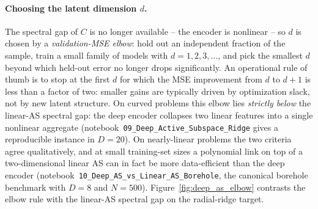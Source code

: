 \documentclass[11pt,a4paper]{report}
\begin{document}
\paragraph{Choosing the latent dimension $d$.}
The spectral gap of $C$ is no longer available -- the encoder is nonlinear -- so $d$ is chosen by a \emph{validation-MSE elbow}: hold out an independent fraction of the sample, train a small family of models with $d = 1, 2, 3, \ldots$, and pick the smallest $d$ beyond which held-out error no longer drops significantly.  An operational rule of thumb is to stop at the first $d$ for which the MSE improvement from $d$ to $d+1$ is less than a factor of two: smaller gains are typically driven by optimization slack, not by new latent structure.  On curved problems this elbow lies \emph{strictly below} the linear-AS spectral gap: the deep encoder collapses two linear features into a single nonlinear aggregate (notebook~\texttt{09\_Deep\_Active\_Subspace\_Ridge} gives a reproducible instance in $D = 20$).  On nearly-linear problems the two criteria agree qualitatively, and at small training-set sizes a polynomial link on top of a two-dimensional linear AS can in fact be more data-efficient than the deep encoder (notebook~\texttt{10\_Deep\_AS\_vs\_Linear\_AS\_Borehole}, the canonical borehole benchmark with $D = 8$ and $N = 500$).  Figure~\ref{fig:deep_as_elbow} contrasts the elbow rule with the linear-AS spectral gap on the radial-ridge target.
\end{document}
